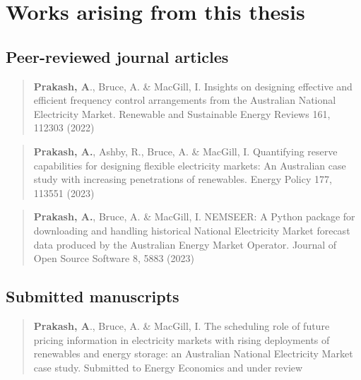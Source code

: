 \documentclass[12pt,a4paper,]{report}
\begin{document}
\newpage

\hypertarget{works-arising-from-this-thesis}{%
\chapter*{Works arising from this
thesis}\label{works-arising-from-this-thesis}}

\hypertarget{peer-reviewed-journal-articles}{%
\section*{Peer-reviewed journal
articles}\label{peer-reviewed-journal-articles}}

\begin{quote}
\textbf{Prakash, A}., Bruce, A. \& MacGill, I. Insights on designing
effective and efficient frequency control arrangements from the
Australian National Electricity Market. Renewable and Sustainable Energy
Reviews 161, 112303 (2022)
\end{quote}

\begin{quote}
\textbf{Prakash, A.}, Ashby, R., Bruce, A. \& MacGill, I. Quantifying
reserve capabilities for designing flexible electricity markets: An
Australian case study with increasing penetrations of renewables. Energy
Policy 177, 113551 (2023)
\end{quote}

\begin{quote}
\textbf{Prakash, A.}, Bruce, A. \& MacGill, I. NEMSEER: A Python package
for downloading and handling historical National Electricity Market
forecast data produced by the Australian Energy Market Operator. Journal
of Open Source Software 8, 5883 (2023)
\end{quote}

\hypertarget{submitted-manuscripts}{%
\section*{Submitted manuscripts}\label{submitted-manuscripts}}

\begin{quote}
\textbf{Prakash, A}., Bruce, A. \& MacGill, I. The scheduling role of
future pricing information in electricity markets with rising
deployments of renewables and energy storage: an Australian National
Electricity Market case study. Submitted to Energy Economics and under
review
\end{quote}
\end{document}

